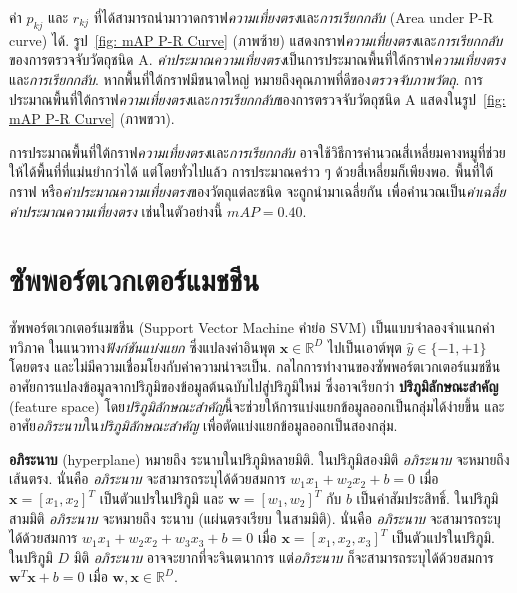 ค่า $p_{kj}$ และ $r_{kj}$ ที่ได้สามารถนำมาวาดกราฟ\textit{ความเที่ยงตรง}และ\textit{การเรียกกลับ} (Area under P-R curve) ได้.
รูป~\ref{fig: mAP P-R Curve} (ภาพซ้าย) แสดงกราฟ\textit{ความเที่ยงตรง}และ\textit{การเรียกกลับ}ของการตรวจจับวัตถุชนิด A.
\textit{ค่าประมาณความเที่ยงตรง}เป็นการประมาณพื้นที่ใต้กราฟ\textit{ความเที่ยงตรง}และ\textit{การเรียกกลับ}. 
หากพื้นที่ใต้กราฟมีขนาดใหญ่ หมายถึงคุณภาพที่ดีของ\textit{ตรวจจับภาพวัตถุ}.
การประมาณพื้นที่ใต้กราฟ\textit{ความเที่ยงตรง}และ\textit{การเรียกกลับ}ของการตรวจจับวัตถุชนิด A
แสดงในรูป~\ref{fig: mAP P-R Curve} (ภาพขวา).

การประมาณพื้นที่ใต้กราฟ\textit{ความเที่ยงตรง}และ\textit{การเรียกกลับ} อาจใช้วิธีการคำนวณสี่เหลี่ยมคางหมูที่ช่วยให้ได้พื้นที่ที่แม่นยำกว่าได้
แต่โดยทั่วไปแล้ว การประมาณคร่าว ๆ ด้วยสี่เหลี่ยมก็เพียงพอ.
พื้นที่ใต้กราฟ หรือ\textit{ค่าประมาณความเที่ยงตรง}ของวัตถุแต่ละชนิด จะถูกนำมาเฉลี่ยกัน 
เพื่อคำนวณเป็น\textit{ค่าเฉลี่ยค่าประมาณความเที่ยงตรง} เช่นในตัวอย่างนี้ $mAP = 0.40$.

\section{ซัพพอร์ตเวกเตอร์แมชชีน}
\label{sec: SVM}

ซัพพอร์ตเวกเตอร์แมชชีน (Support Vector Machine\cite{CortesVapnik1995a} คำย่อ SVM)
เป็นแบบจำลองจำแนกค่าทวิภาค ในแนวทาง\textit{ฟังก์ชันแบ่งแยก} 
ซึ่งแปลงค่าอินพุต $\bm{x} \in \mathbb{R}^D$ ไปเป็นเอาต์พุต $\hat{y} \in \{-1, +1\}$ โดยตรง
และไม่มีความเชื่อมโยงกับค่าความน่าจะเป็น.
กลไกการทำงานของซัพพอร์ตเวกเตอร์แมชชีน
อาศัยการแปลงข้อมูลจากปริภูมิของข้อมูลต้นฉบับไปสู่ปริภูมิใหม่
ซึ่งอาจเรียกว่า \textbf{ปริภูมิลักษณะสำคัญ} (feature space)
โดย\textit{ปริภูมิลักษณะสำคัญ}นี้จะช่วยให้การแบ่งแยกข้อมูลออกเป็นกลุ่มได้ง่ายขึ้น
และอาศัย\textit{อภิระนาบ}ใน\textit{ปริภูมิลักษณะสำคัญ}
เพื่อตัดแบ่งแยกข้อมูลออกเป็นสองกลุ่ม.

\textbf{อภิระนาบ} (hyperplane) หมายถึง ระนาบในปริภูมิหลายมิติ.
ในปริภูมิสองมิติ \textit{อภิระนาบ} จะหมายถึง เส้นตรง.
นั่นคือ \textit{อภิระนาบ} จะสามารถระบุได้ด้วยสมการ $w_1 x_1 + w_2 x_2 + b = 0$
เมื่อ $\bm{x} = [x_1, x_2]^T$ เป็นตัวแปรในปริภูมิ
และ
$\bm{w} = [w_1, w_2]^T$ กับ $b$ เป็นค่าสัมประสิทธิ์.
ในปริภูมิสามมิติ \textit{อภิระนาบ} จะหมายถึง ระนาบ (แผ่นตรงเรียบ ในสามมิติ).
นั่นคือ \textit{อภิระนาบ} จะสามารถระบุได้ด้วยสมการ $w_1 x_1 + w_2 x_2 + w_3 x_3 + b = 0$
เมื่อ $\bm{x} = [x_1, x_2, x_3]^T$ เป็นตัวแปรในปริภูมิ.
ในปริภูมิ $D$ มิติ \textit{อภิระนาบ} อาจจะยากที่จะจินตนาการ
แต่\textit{อภิระนาบ} ก็จะสามารถระบุได้ด้วยสมการ $\bm{w}^T \bm{x} + b = 0$
เมื่อ $\bm{w}, \bm{x} \in \mathbb{R}^D$.

